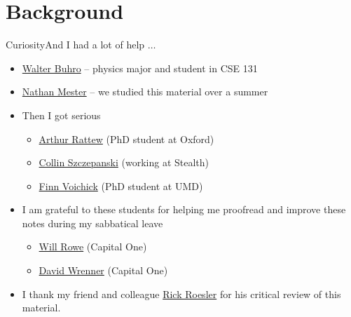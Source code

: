 \section{Background}
\begin{frame}{Curiosity}{And I had a lot of help $\ldots$}
\begin{itemize}
    \item \href{https://www.linkedin.com/in/walter-buhro-3262721aa/}{Walter Buhro} -- physics major and student in CSE 131
    \item \href{https://olin.wustl.edu/doctoral-student/nathan-mester}{Nathan Mester} -- we studied this material over a summer
    \item Then I got serious
    \begin{itemize}
        \item \href{https://www.linkedin.com/in/arthur-rattew/}{Arthur Rattew} (PhD student at Oxford)
        \item \href{https://www.linkedin.com/in/collin-szczepanski-3898a89b/}{Collin Szczepanski} (working at Stealth)
        \item \href{https://finn.voichick.com/}{Finn Voichick} (PhD student at UMD)
    \end{itemize}
    \item I am grateful to these students for helping me proofread and improve these notes during my sabbatical leave
    \begin{itemize}
        \item \href{https://www.linkedin.com/in/william-j-rowe/}{Will Rowe} (Capital One)
        \item \href{https://www.linkedin.com/in/davidwrenner/}{David Wrenner} (Capital One)
    \end{itemize}
    \item I thank my friend and colleague \href{https://www.linkedin.com/in/rickroesler/}{Rick Roesler} for his critical review of this material.
\end{itemize}
    
\end{frame}

